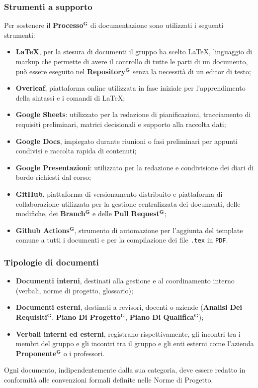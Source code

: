 \documentclass[a4paper,12pt]{article}
\newcommand{\term}[1]{\textbf{#1}$^\mathbf{G}$}
\begin{document}
\subsubsection{Strumenti a supporto}
Per sostenere il \term{Processo} di documentazione sono utilizzati i seguenti strumenti:
\begin{itemize}
  \item \textbf{\LaTeX}, per la stesura di documenti il gruppo ha scelto \LaTeX, linguaggio di markup che permette di avere il controllo di tutte le parti di un documento, può essere eseguito nel \term{Repository} senza la necessità di un editor di testo; 
  \item \textbf{Overleaf}, piattaforma online utilizzata in fase iniziale per l'apprendimento della sintassi e i comandi di \LaTeX;
  \item \textbf{Google Sheets}: utilizzato per la redazione di pianificazioni, tracciamento di requisiti preliminari, matrici decisionali e supporto alla raccolta dati;
  \item \textbf{Google Docs}, impiegato durante riunioni o fasi preliminari per appunti condivisi e raccolta rapida di contenuti;
  \item \textbf{Google Presentazioni}: utilizzato per la redazione e condivisione dei diari di bordo richiesti dal corso;
  \item \textbf{GitHub}, piattaforma di versionamento distribuito e piattaforma di collaborazione utilizzata per la gestione centralizzata dei documenti, delle modifiche, dei \term{Branch} e delle \term{Pull Request};  
  \item \textbf{\term{Github Actions}}, strumento di automazione per l'aggiunta del template comune a tutti i documenti e per la compilazione dei file \texttt{.tex} in \texttt{PDF}.
\end{itemize}

\subsubsection{Tipologie di documenti}
\begin{itemize}
    \item \textbf{Documenti interni}, destinati alla gestione e al coordinamento interno (verbali, norme di progetto, glossario);
    \item \textbf{Documenti esterni}, destinati a revisori, docenti o aziende (\term{Analisi Dei Requisiti}, \term{Piano Di Progetto}, \term{Piano Di Qualifica});
    \item \textbf{Verbali interni ed esterni}, registrano rispettivamente, gli incontri tra i membri del gruppo e gli incontri tra il gruppo e gli enti esterni come l'azienda \term{Proponente} o i professori.
\end{itemize}
Ogni documento, indipendentemente dalla sua categoria, deve essere redatto in conformità alle convenzioni formali definite nelle Norme di Progetto.
\end{document}
